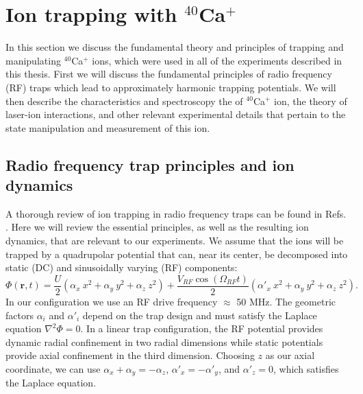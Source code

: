 \chapter{Ion trapping with {$^{40}$Ca$^+$}}

In this section we discuss the fundamental theory and principles of trapping and manipulating $^{40}$Ca$^+$ ions, which were used in all of the experiments described in this thesis. First we will discuss the fundamental principles of radio frequency (RF) traps which lead to approximately harmonic trapping potentials. We will then describe the characteristics and spectroscopy the of $^{40}$Ca$^+$ ion, the theory of laser-ion interactions, and other relevant experimental details that pertain to the state manipulation and measurement of this ion. 



\section{Radio frequency trap principles and ion dynamics}

A thorough review of ion trapping in radio frequency traps can be found in Refs. \cite{Wineland98.NIST.103.259, Leibfried03.RMP.75.281, Häffner2008155, Roos00.Thesis}. Here we will review the essential principles, as well as the resulting ion dynamics, that are relevant to our experiments. We assume that the ions will be trapped by a quadrupolar potential that can, near its center, be decomposed into static (DC) and sinusoidally varying (RF) components:
\begin{equation} 
\Phi (\textbf{r}, t) = \frac{U}{2} ( \alpha_x \ x^2 + \alpha_y \ y^2 + \alpha_z \ z^2 ) + \frac{V_{RF} \cos{(\Omega_{RF} t)}}{2} ( \alpha'_x \ x^2 + \alpha_y \ y^2 + \alpha_z \ z^2 ) \text{.}
\end{equation}
In our configuration we use an RF drive frequency $\approx$ 50 MHz. The geometric factors $\alpha_i$ and $\alpha'_i$ depend on the trap design and must satisfy the Laplace equation $\nabla^2 \Phi = 0$. In a linear trap configuration, the RF potential provides dynamic radial confinement in two radial dimensions while static potentials provide axial confinement in the third dimension. Choosing $z$ as our axial coordinate, we can use $\alpha_x + \alpha_y = - \alpha_z$, $\alpha'_x = - \alpha'_y$, and $\alpha'_z = 0$, which satisfies the Laplace equation. 

